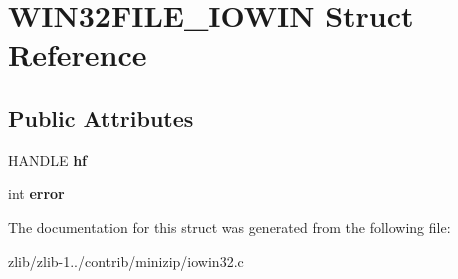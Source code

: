 \hypertarget{struct_w_i_n32_f_i_l_e___i_o_w_i_n}{\section{W\+I\+N32\+F\+I\+L\+E\+\_\+\+I\+O\+W\+I\+N Struct Reference}
\label{struct_w_i_n32_f_i_l_e___i_o_w_i_n}
}
\subsection*{Public Attributes}
\begin{DoxyCompactItemize}
\item 
\hypertarget{struct_w_i_n32_f_i_l_e___i_o_w_i_n_aef23f62010af57376fd452e88c602214}{H\+A\+N\+D\+L\+E {\bfseries hf}}\label{struct_w_i_n32_f_i_l_e___i_o_w_i_n_aef23f62010af57376fd452e88c602214}

\item 
\hypertarget{struct_w_i_n32_f_i_l_e___i_o_w_i_n_a074fe7f1d96aad43a9e2a4c575dfebb9}{int {\bfseries error}}\label{struct_w_i_n32_f_i_l_e___i_o_w_i_n_a074fe7f1d96aad43a9e2a4c575dfebb9}

\end{DoxyCompactItemize}


The documentation for this struct was generated from the following file\+:\begin{DoxyCompactItemize}
\item 
zlib/zlib-\/1../contrib/minizip/iowin32.\+c\end{DoxyCompactItemize}
